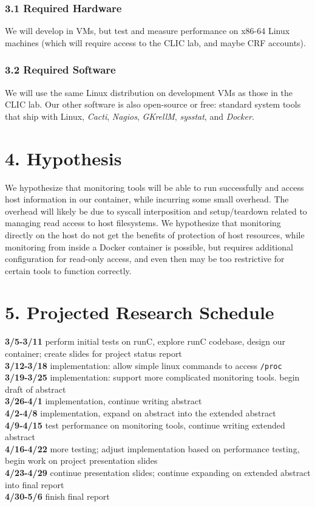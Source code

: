 \documentclass{proc}
\begin{document}
\subsubsection*{3.1 Required Hardware}

We will develop in VMs, but test and measure performance on x86-64 Linux machines (which will require access to the CLIC lab, and maybe CRF accounts).

\subsubsection*{3.2 Required Software}

We will use the same Linux distribution on development VMs as those in the CLIC lab. Our other software is also open-source or free: standard system tools that ship with Linux, \textit{Cacti}, \textit{Nagios}, \textit{GKrellM}, \textit{sysstat}, and \textit{Docker}.

\section*{4. Hypothesis}

We hypothesize that monitoring tools will be able to run successfully and access host information in our container, while incurring some small overhead. The overhead will likely be due to syscall interposition and setup/teardown related to managing read access to host filesystems. We hypothesize that monitoring directly on the host do not get the benefits of protection of host resources, while monitoring from inside a Docker container is possible, but requires additional configuration for read-only access, and even then may be too restrictive for certain tools to function correctly.

\section*{5. Projected Research Schedule}

\textbf{3/5-3/11} perform initial tests on runC, explore runC codebase, design our container; create slides for project status report\\
\textbf{3/12-3/18} implementation: allow simple linux commands to access \texttt{/proc}\\
\textbf{3/19-3/25} implementation: support more complicated monitoring tools. begin draft of abstract\\
\textbf{3/26-4/1} implementation, continue writing abstract\\
\textbf{4/2-4/8} implementation, expand on abstract into the extended abstract\\
\textbf{4/9-4/15} test performance on monitoring tools, continue writing extended abstract\\
\textbf{4/16-4/22} more testing; adjust implementation based on performance testing, begin work on project presentation slides\\
\textbf{4/23-4/29} continue presentation slides; continue expanding on extended abstract into final report\\
\textbf{4/30-5/6} finish final report



\end{document}
